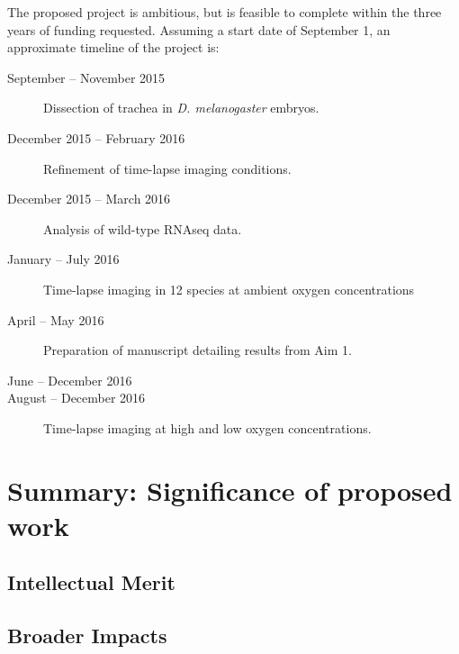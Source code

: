 \documentclass{proposal}
\begin{document}
The proposed project is ambitious, but is feasible to complete within the three years of funding requested.  Assuming a start date of September 1, an approximate timeline of the project is: 

\begin{description}
\item[September -- November 2015] Dissection of trachea in {\em D. melanogaster} embryos.  

\item[December 2015 -- February 2016] Refinement of time-lapse imaging conditions. 

\item[December 2015 -- March 2016] Analysis of wild-type RNAseq data. 

\item[January -- July 2016] Time-lapse imaging in 12 species at ambient oxygen concentrations

\item[April -- May 2016] Preparation of manuscript detailing results from Aim 1.

\item[June -- December 2016] 

\item[August -- December 2016] Time-lapse imaging at high and low oxygen concentrations.


\item[]  

\end{description}



\section{Summary:  Significance of proposed work}

\subsection{Intellectual Merit}

\subsection{Broader Impacts}




\newpage
{}
\renewcommand{\thepage} {E--\arabic{page}}



\end{document}
